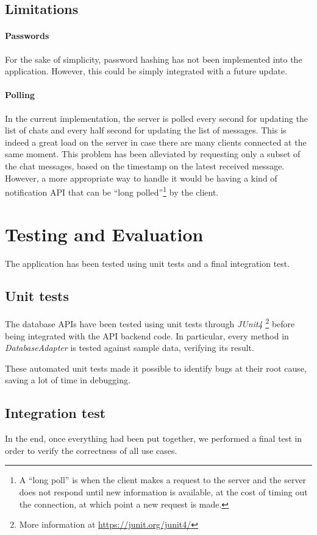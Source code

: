 \documentclass[10pt]{article}
\begin{document}
\subsection{Limitations}
\paragraph{Passwords}
For the sake of simplicity, password hashing has not been implemented into the 
application. However, this could be simply integrated with a future update.

\paragraph{Polling}
In the current implementation, the server is polled every second for updating 
the list of chats and every half second for updating the list of messages. This 
is indeed a great load on the server in case there are many clients connected 
at the same moment. 
This problem has been alleviated by requesting only a subset of the chat 
messages, based on the timestamp on the latest received message.
However, 
a more appropriate way to handle it would be having a kind of notification API
that can be ``long polled''\footnote{A ``long poll'' is when the client 
makes a request to the server and the server does not respond until new 
information is available, at the cost of timing out the connection, at which 
point a new request is made.} by the client.

\clearpage
\section{Testing and Evaluation}
The application has been tested using unit tests and a final integration test.

\subsection{Unit tests}
The database APIs have been tested using unit tests through \emph{JUnit4}
\footnote{More information at \url{https://junit.org/junit4/}} before being 
integrated with the API backend code. In particular, every method in 
\emph{DatabaseAdapter} is tested against sample data, verifying its result.

These automated unit tests made it possible to identify bugs at their root cause,
saving a lot of time in debugging.

\subsection{Integration test}
In the end, once everything had been put together, we performed a final test 
in order to verify the correctness of all use cases.
\end{document}
